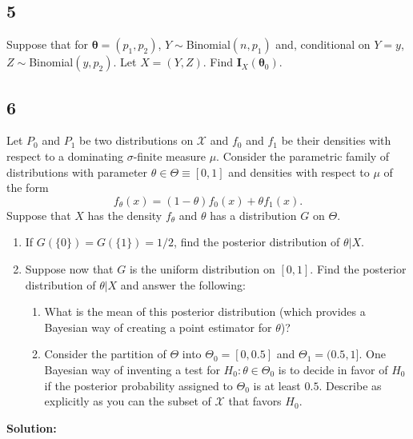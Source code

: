 \documentclass[12pt]{article}
\begin{document}
\subsection*{5}
\begin{tcolorbox}
  Suppose that for $\bm{\theta}=(p_1,p_2)$, $Y\sim$Binomial$(n,p_1)$ and, conditional on $Y=y$, $Z\sim$Binomial$(y,p_2)$. Let $X=(Y,Z)$.  Find $\bm{I}_{X}(\bm{\theta}_0)$.
\end{tcolorbox}


\subsection*{6}
\begin{tcolorbox}
  Let $P_0$ and $P_1$ be two distributions on $\mathcal{X}$ and $f_0$ and $f_1$ be their densities with respect to a dominating $\sigma$-finite
  measure $\mu$.  Consider the parametric family of distributions with parameter $\theta \in \Theta \equiv [0,1]$ and densities with respect to $\mu$
  of the form
  \[
    f_\theta(x) = (1-\theta) f_0(x) +\theta f_1(x).
  \]
  Suppose that $X$ has the density $f_\theta$ and $\theta$ has a distribution $G$ on $\Theta$.
  \begin{enumerate}
    \item If $G(\{0\})=G(\{1\})=1/2$, find the posterior distribution of $\theta|X$.
    \item Suppose now that $G$ is the uniform distribution on $[0,1]$.  Find the posterior distribution of $\theta|X$ and answer  the following:

      \begin{enumerate}
        \item What is the mean of this posterior distribution (which provides a Bayesian way of creating a point estimator for $\theta$)?
        \item Consider the partition of $\Theta$ into $\Theta_0=[0,0.5]$ and $\Theta_1=(0.5,1]$.  One Bayesian way of inventing a test for $H_0: \theta \in \Theta_0$ is to decide in favor of $H_0$ if the posterior probability assigned to $\Theta_0$ is at least $0.5$. Describe as explicitly as you can the subset of $\mathcal{X}$ that favors $H_0$.
      \end{enumerate}
  \end{enumerate}
\end{tcolorbox}

\textbf{Solution:}
\end{document}
